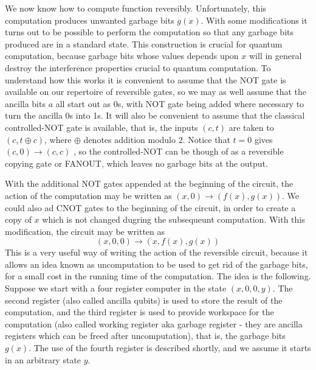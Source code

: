 We now know how to compute function reversibly. Unfortunately, this computation produces unwanted garbage bits $g(x)$. With some modifications it turns out to be possible to perform the computation so that any garbage bits produced are in a standard state. This construction is crucial for quantum computation, because garbage bits whose values depends upon $x$ will in general destroy the interference properties crucial to quantum computation. To understand how this works it is convenient to assume that the NOT gate is available on our repertoire of reversible gates, so we may as well assume that the ancilla bits $a$ all start out as 0s, with NOT gate being added where necessary to turn the ancilla 0s into 1s. It will also be convenient to assume that the classical controlled-NOT gate is available, that is, the inputs $(c,t)$ are taken to $(c,t\oplus c)$, where $\oplus$ denotes addition modulo $2$. Notice that $t=0$ gives $(c,0)\rightarrow (c,c)$ , so the controlled-NOT can be though of as a reversible copying gate or FANOUT, which leaves no garbage bits at the output.

With the additional NOT gates appended at the beginning of the circuit, the action of the computation may be written as $(x,0)\rightarrow (f(x),g(x))$. We could also ad CNOT gates to the beginning of the circuit, in order to create a copy of $x$ which is not changed dugring the subsequeunt computation. With this modification, the circuit may be written as
\[
(x,0,0)\rightarrow (x,f(x),g(x))
\]
This is a very useful way of writing the action of the reversible circuit, because it allows an idea known as uncomputation to be used to get rid of the garbage bits, for a small cost in the running time of the computation. The idea is the following. Suppose we start with a four register computer in the state $
(x,0,0,y)$. The second register (also called ancilla qubits) is used to store the result of the computation, and the third register is used to provide workspace for the computation (also called working register aka garbage register - they are ancilla registers which can be freed after uncomputation), that is, the garbage bits $g(x)$. The use of the fourth register is described shortly, and we assume it starts in an arbitrary state $y$.

